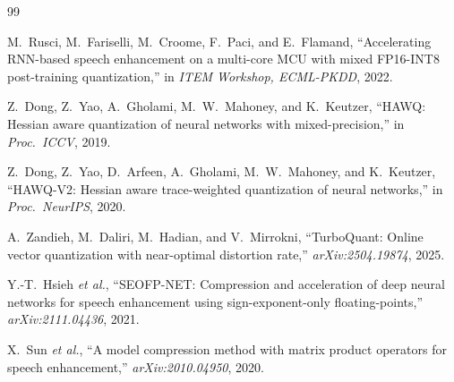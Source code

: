 \documentclass[conference]{IEEEtran}
\begin{document}
\begin{thebibliography}{99}

M.~Rusci, M.~Fariselli, M.~Croome, F.~Paci, and E.~Flamand, ``Accelerating RNN-based speech
enhancement on a multi-core MCU with mixed FP16-INT8 post-training quantization,'' in \emph{ITEM
Workshop, ECML-PKDD}, 2022.

Z.~Dong, Z.~Yao, A.~Gholami, M.~W.~Mahoney, and K.~Keutzer, ``HAWQ: Hessian aware quantization of
neural networks with mixed-precision,'' in \emph{Proc.\ ICCV}, 2019.

Z.~Dong, Z.~Yao, D.~Arfeen, A.~Gholami, M.~W.~Mahoney, and K.~Keutzer, ``HAWQ-V2: Hessian aware
trace-weighted quantization of neural networks,'' in \emph{Proc.\ NeurIPS}, 2020.

A.~Zandieh, M.~Daliri, M.~Hadian, and V.~Mirrokni, ``TurboQuant: Online vector quantization with
near-optimal distortion rate,'' \emph{arXiv:2504.19874}, 2025.

Y.-T.~Hsieh \emph{et al.}, ``SEOFP-NET: Compression and acceleration of deep neural networks for
speech enhancement using sign-exponent-only floating-points,'' \emph{arXiv:2111.04436}, 2021.

X.~Sun \emph{et al.}, ``A model compression method with matrix product operators for speech
enhancement,'' \emph{arXiv:2010.04950}, 2020.

\end{thebibliography}
\end{document}
